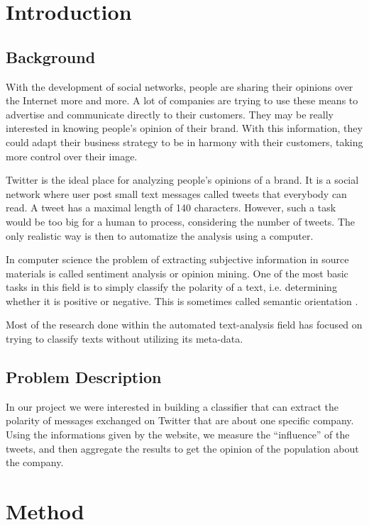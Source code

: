 \documentclass[a4paper,12pt]{report}
\begin{document}
\tableofcontents

\clearpage
\chapter{Introduction}

\section{Background}
With the development of social networks, people are sharing their opinions over the Internet more and more.
A lot of companies are trying to use these means to advertise and communicate directly to their customers.
They may be really interested in knowing people's opinion of their brand.
With this information, they could adapt their business strategy to be in harmony with their customers, taking more control over their image.

Twitter \cite{TwitterAbout} is the ideal place for analyzing people's opinions of a brand. 
It is a social network where user post small text messages called tweets that everybody can read. 
A tweet has a maximal length of 140 characters. However, such a task would be too big for a human to process, considering the number of tweets.
The only realistic way is then to automatize the analysis using a computer.

In computer science the problem of extracting subjective information in source materials is called sentiment analysis or opinion mining. 
One of the most basic tasks in this field is to simply classify the polarity of a text, i.e. determining whether it is positive or negative. 
This is sometimes called semantic orientation \cite{SenWiki}. 

Most of the research done within the automated text-analysis field has focused on trying to classify texts without utilizing its meta-data.

\section{Problem Description}

In our project we were interested in building a classifier that can extract the polarity of messages exchanged on Twitter that are about one specific company. Using the informations given by the website, we measure the ``influence'' of the tweets, and then aggregate the results to get the opinion of the population about the company.

\chapter{Method}
\end{document}
